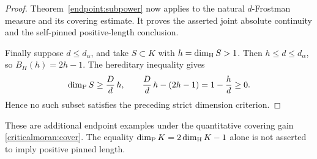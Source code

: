 \begin{proof}
Theorem~\ref{endpoint:subpower} now applies to the natural
\(d\)-Frostman measure and its covering estimate. It proves the
asserted joint absolute continuity and the self-pinned
positive-length conclusion.

Finally suppose \(d\le d_\alpha\), and take \(S\subset K\) with
\(h=\dim_{\mathrm H} S>1\). Then \(h\le d\le d_\alpha\), so
\(B_H(h)=2h-1\). The hereditary inequality gives
\[
 \dim_{\mathrm P} S\ge\frac Dd\,h,\qquad
 \frac Dd\,h-(2h-1)=1-\frac hd\ge0.
\]
Hence no such subset satisfies the preceding strict dimension
criterion.
\end{proof}

These are additional endpoint examples under the quantitative covering
gain \eqref{criticalmoran:cover}. The equality \(\dim_{\mathrm P} K=2\dim_{\mathrm H} K-1\)
alone is not asserted to imply positive pinned length.
